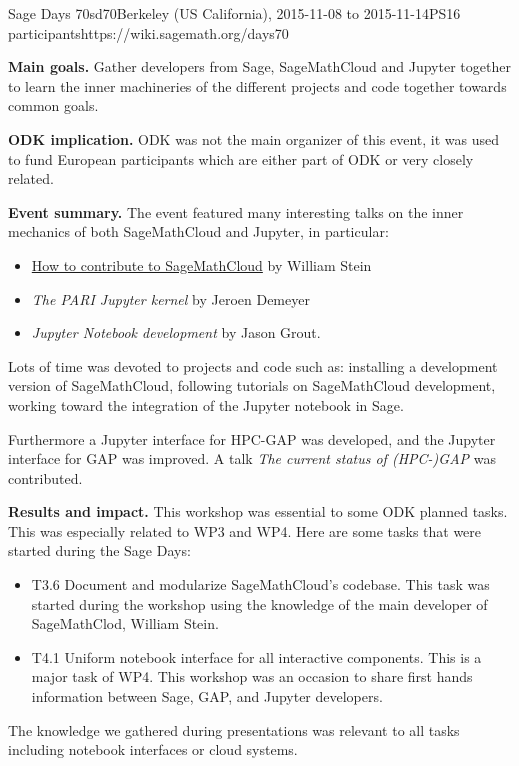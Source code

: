 \begin{event}{Sage Days 70}{sd70}{Berkeley (US California), 2015-11-08 to 2015-11-14}{PS}{16 participants}{https://wiki.sagemath.org/days70}

\textbf{Main goals.} Gather developers from Sage, SageMathCloud and Jupyter together to learn the
inner machineries of the different projects and code together towards common goals.

\textbf{ODK implication.} ODK was not the main organizer of this event, it was used to fund
European participants which are either part of ODK or very closely related.

\textbf{Event summary.} The event featured many interesting talks on the inner mechanics of
both SageMathCloud and Jupyter, in particular:
\begin{itemize}
\item \href{https://youtu.be/GOuy07Kift4}{How to contribute to SageMathCloud} by William Stein
\item \emph{The PARI Jupyter kernel} by Jeroen Demeyer
\item \emph{Jupyter Notebook development} by Jason Grout.
\end{itemize}
Lots of time was devoted to projects and code such as: installing a development version of SageMathCloud,
following tutorials on SageMathCloud development, working toward the integration of the Jupyter notebook
in Sage.

Furthermore a Jupyter interface for HPC-GAP was developed, and the Jupyter
interface for GAP was improved. A talk \emph{The current status of (HPC-)GAP}
was contributed.

\textbf{Results and impact.} 
This workshop was essential to some ODK planned tasks. This was especially related to WP3 and WP4. Here are some tasks that
were started during the Sage Days:
\begin{itemize}
\item T3.6 Document and modularize SageMathCloud's codebase. This task was started during the workshop using the 
knowledge of the main developer of SageMathClod, William Stein.

\item T4.1 Uniform notebook interface for all interactive components. This is a major task of WP4. This workshop
was an occasion to share first hands information between Sage, GAP, and Jupyter developers.

\end{itemize}
The knowledge we gathered during presentations was relevant to all tasks including notebook interfaces or cloud
systems.

\end{event}